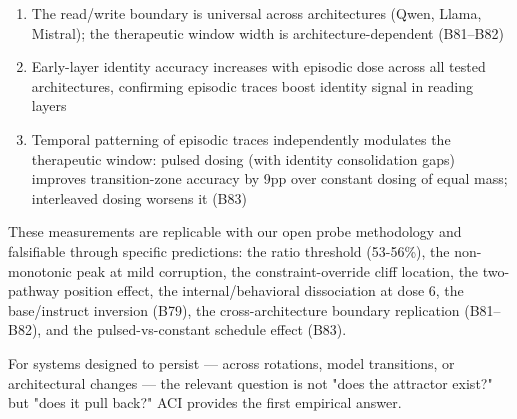 \documentclass[11pt]{article}
\begin{document}
\begin{enumerate}
\item The read/write boundary is universal across architectures (Qwen, Llama, Mistral);
  the therapeutic window width is architecture-dependent (B81--B82)
\item Early-layer identity accuracy increases with episodic dose across all tested
  architectures, confirming episodic traces boost identity signal in reading layers
\item Temporal patterning of episodic traces independently modulates the therapeutic
  window: pulsed dosing (with identity consolidation gaps) improves transition-zone
  accuracy by 9pp over constant dosing of equal mass; interleaved dosing worsens it (B83)
\end{enumerate}

These measurements are replicable with our open probe methodology and falsifiable
through specific predictions: the ratio threshold (53-56\%), the non-monotonic
peak at mild corruption, the constraint-override cliff location, the two-pathway
position effect, the internal/behavioral dissociation at dose 6, the base/instruct
inversion (B79), the cross-architecture boundary replication (B81--B82), and the
pulsed-vs-constant schedule effect (B83).

For systems designed to persist --- across rotations, model transitions, or
architectural changes --- the relevant question is not "does the attractor exist?"
but "does it pull back?" ACI provides the first empirical answer.
\end{document}
